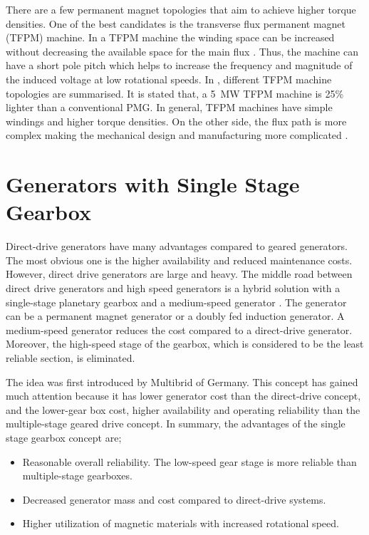 \documentclass[a4paper, 11pt]{article} %
\begin{document}
There are a few permanent magnet topologies that aim to achieve higher torque densities. One of the best candidates is the transverse flux permanent magnet (TFPM) machine. In a TFPM machine the winding space can be increased without decreasing the available space for the main flux \cite{Bang2010}. Thus, the machine can have a short pole pitch which helps to increase the frequency and magnitude of the induced voltage at low rotational speeds. In \cite{Bang2010}, different TFPM machine topologies are summarised. It is stated that, a 5~MW TFPM machine is  25\% lighter than a conventional PMG. In general, TFPM machines have simple windings and higher torque densities. On the other side, the flux path is more complex making the mechanical design and manufacturing more complicated \cite{Bang2008,Bang2009}.

\section{Generators with Single Stage Gearbox}

Direct-drive generators have many advantages compared to geared generators. The most obvious one is the higher availability and reduced maintenance costs. However, direct drive generators are large and heavy. The middle road between direct drive generators and high speed generators is a hybrid solution with a single-stage planetary gearbox and a medium-speed generator \cite{Li2009}. The generator can be a permanent magnet generator or a doubly fed induction generator. A medium-speed generator reduces the cost compared to a direct-drive generator. Moreover, the high-speed stage of the gearbox, which is considered to be the least reliable section, is eliminated. 

The idea was first introduced by Multibrid of Germany. This concept has gained much attention because it has lower generator cost than the direct-drive concept, and the lower-gear box cost, higher availability and operating reliability than the multiple-stage geared drive concept. In summary, the advantages of the single stage gearbox concept are;

\begin{itemize}
  \item Reasonable overall reliability. The low-speed gear stage is more reliable than multiple-stage gearboxes.
  \item Decreased generator mass and cost compared to direct-drive systems.
  \item Higher utilization of magnetic materials with increased rotational speed.
\end{itemize}
\end{document}
